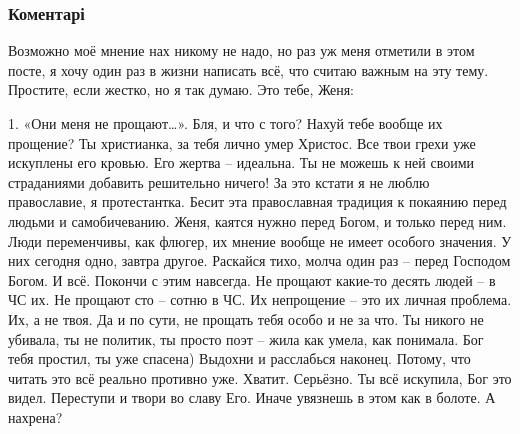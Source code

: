  
 
 
 
 
\subsubsection{Коментарі}
\label{sec:15_09_2021.fb.nikonov_sergej.2.recenzia_film_strasti_po_zoje.cmt}

\begin{itemize} %

Возможно моё мнение нах никому не надо, но раз уж меня отметили в этом посте, я
хочу один раз в жизни написать всё, что считаю важным на эту тему. Простите,
если жестко, но я так думаю. Это тебе, Женя:

1. «Они меня не прощают…». Бля, и что с того? Нахуй тебе вообще их прощение? Ты
христианка, за тебя лично умер Христос. Все твои грехи уже искуплены его
кровью. Его жертва – идеальна. Ты не можешь к ней своими страданиями добавить
решительно ничего! За это кстати я не люблю православие, я протестантка. Бесит
эта православная традиция к покаянию перед людьми и самобичеванию. Женя, каятся
нужно перед Богом, и только перед ним. Люди переменчивы, как флюгер, их мнение
вообще не имеет особого значения. У них сегодня одно, завтра другое. Раскайся
тихо, молча один раз – перед Господом Богом. И всё. Покончи с этим навсегда. Не
прощают какие-то десять людей – в ЧС их. Не прощают сто – сотню в ЧС. Их
непрощение – это их личная проблема. Их, а не твоя. Да и по сути, не прощать
тебя особо и не за что. Ты никого не убивала, ты не политик, ты просто поэт –
жила как умела, как понимала. Бог тебя простил, ты уже спасена) Выдохни и
расслабься наконец. Потому, что читать это всё реально противно уже. Хватит.
Серьёзно. Ты всё искупила, Бог это видел. Переступи и твори во славу Его. Иначе
увязнешь в этом как в болоте. А нахрена?


\end{itemize}
